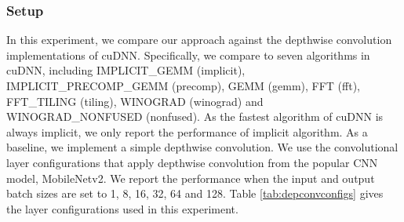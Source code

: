\subsubsection{Setup} In this experiment, we compare our approach against the depthwise convolution implementations of cuDNN. Specifically, we compare to seven algorithms in cuDNN, including IMPLICIT\_GEMM (implicit), IMPLICIT\_PRECOMP\_GEMM (precomp), GEMM (gemm), FFT (fft), FFT\_TILING (tiling), WINOGRAD (winograd) and WINOGRAD\_NONFUSED (nonfused). 
As the fastest algorithm of cuDNN is always implicit, we only report the performance of implicit algorithm. 
As a baseline, we implement a simple depthwise convolution. 
We use the convolutional layer configurations that apply depthwise convolution from the popular CNN model, MobileNetv2. 
We report the performance when the input and output batch
sizes are set to 1, 8, 16, 32, 64 and 128. 
Table \ref{tab:depconvconfigs} gives the layer configurations used in this experiment.


